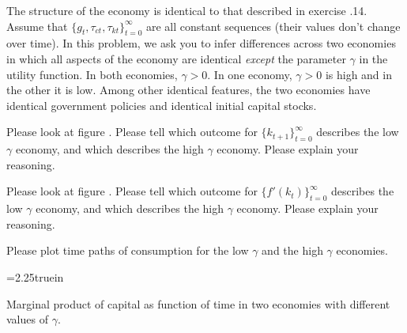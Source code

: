 %




\medskip
{}
\medskip
\noindent
 The structure of the  economy is identical to that described in exercise \the\chapternum.14.
Assume that $\{g_t, \tau_{ct}, \tau_{kt}\}_{t=0}^\infty $ are all constant sequences (their values don't change over time).
In this problem, we ask you to infer  differences
across two economies in which all aspects of the economy are identical {\it except} the parameter $\gamma$ in the utility function. In both economies, $\gamma > 0$.  In one economy, $\gamma >0$ is high and in the other it is low.
Among other identical features, the two economies have identical government policies and identical initial capital stocks.\medskip
\medskip

   Please look at figure . Please tell which outcome for $\{k_{t+1}\}_{t=0}^\infty$ describes the low $\gamma$ economy, and which describes the high $\gamma$ economy.
Please explain your reasoning.\medskip

   Please look at figure . Please tell which outcome for $\{f'(k_t)\}_{t=0}^\infty$ describes the low $\gamma$ economy, and which describes the high $\gamma$ economy.
Please explain your reasoning.
\medskip

 Please plot time paths of consumption for the low $\gamma$ and the high $\gamma$ economies.
\medskip
%
%





\medskip



\centerline{\epsfxsize=2.25truein}
\caption{Marginal product of capital as function of time in two economies with different values of $\gamma$.}
\endfigure
\medskip

